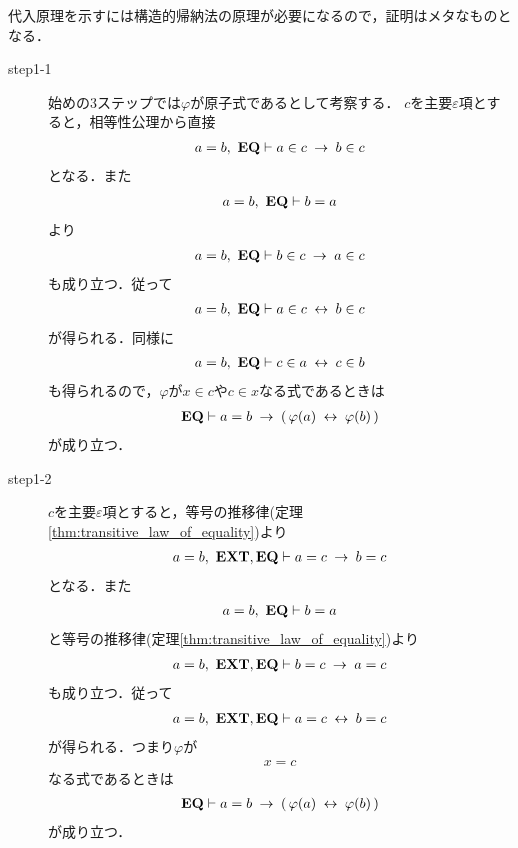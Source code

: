 	\begin{sketch} 代入原理を示すには構造的帰納法の原理が必要になるので，証明はメタなものとなる．
		\begin{description}
			\item[step1-1]
				始めの$3$ステップでは$\varphi$が原子式であるとして考察する．
				$c$を主要$\varepsilon$項とすると，相等性公理から直接
				\begin{align}
					a = b,\ \mbox{{\bf EQ}} \vdash a \in c \hspace{0.25em}\rightarrow\hspace{0.25em} b \in c
				\end{align}
				となる．また
				\begin{align}
					a = b,\ \mbox{{\bf EQ}} \vdash b = a
				\end{align}
				より
				\begin{align}
					a = b,\ \mbox{{\bf EQ}} \vdash b \in c \hspace{0.25em}\rightarrow\hspace{0.25em} a \in c
				\end{align}
				も成り立つ．従って
				\begin{align}
					a = b,\ \mbox{{\bf EQ}} \vdash a \in c \hspace{0.25em}\leftrightarrow\hspace{0.25em} b \in c
				\end{align}
				が得られる．同様に
				\begin{align}
					a = b,\ \mbox{{\bf EQ}} \vdash c \in a \hspace{0.25em}\leftrightarrow\hspace{0.25em} c \in b
				\end{align}
				も得られるので，$\varphi$が$x \in c$や$c \in x$なる式であるときは
				\begin{align}
					\mbox{{\bf EQ}} \vdash a = b \hspace{0.25em}\rightarrow\hspace{0.25em} (\, \varphi(a) \hspace{0.25em}\leftrightarrow\hspace{0.25em} \varphi(b)\, )
				\end{align}
				が成り立つ．
			
			\item[step1-2]
				$c$を主要$\varepsilon$項とすると，等号の推移律(定理\ref{thm:transitive_law_of_equality})より
				\begin{align}
					a = b,\ \mbox{{\bf EXT}},\mbox{{\bf EQ}} \vdash a = c \hspace{0.25em}\rightarrow\hspace{0.25em} b = c
				\end{align}
				となる．また
				\begin{align}
					a = b,\ \mbox{{\bf EQ}} \vdash b = a
				\end{align}
				と等号の推移律(定理\ref{thm:transitive_law_of_equality})より
				\begin{align}
					a = b,\ \mbox{{\bf EXT}},\mbox{{\bf EQ}} \vdash b = c \hspace{0.25em}\rightarrow\hspace{0.25em} a = c
				\end{align}
				も成り立つ．従って
				\begin{align}
					a = b,\ \mbox{{\bf EXT}},\mbox{{\bf EQ}} \vdash a = c \hspace{0.25em}\leftrightarrow\hspace{0.25em} b = c
				\end{align}
				が得られる．つまり$\varphi$が
				\begin{align}
					x = c
				\end{align}
				なる式であるときは
				\begin{align}
					\mbox{{\bf EQ}} \vdash a = b \hspace{0.25em}\rightarrow\hspace{0.25em} (\, \varphi(a) \hspace{0.25em}\leftrightarrow\hspace{0.25em} \varphi(b)\, )
				\end{align}
				が成り立つ．
				

\end{description}
\end{sketch}

